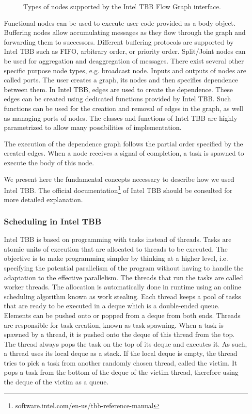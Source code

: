\begin{figure}[phbt]
\centering

\caption{Types of nodes supported by the Intel TBB Flow Graph interface.}
\label{fig:tbbnodes}
\end{figure}

Functional nodes can be used to execute user code provided as a body object. Buffering nodes allow accumulating messages as they flow through the graph and forwarding them to successors. Different buffering protocols are supported by Intel TBB such as FIFO, arbitrary order, or priority order. Split/Joint nodes can be used for aggregation and deaggregation of messages. There exist several other specific purpose node types, e.g. broadcast node. Inputs and outputs of nodes are called ports. %
The user creates a graph, its nodes and then specifies dependence between them. In Intel TBB, edges are used to create the dependence. These edges can be created using dedicated functions provided by Intel TBB. Such functions can be used for the creation and removal of edges in the graph, as well as managing ports of nodes.
The classes and functions of Intel TBB are highly parametrized to allow many possibilities of implementation.

The execution of the dependence graph follows the partial order specified by the created edges. When a node receives a signal of completion, a task is spawned to execute the body of this node. 

We present here the fundamental concepts necessary to describe how we used Intel TBB. The official documentation\footnote{software.intel.com/en-us/tbb-reference-manual} of Intel TBB should be consulted for more detailed explanation. 


\subsubsection{Scheduling in Intel TBB}

Intel TBB is based on programming with tasks instead of threads. Tasks are atomic units of execution that are allocated to threads to be executed. The objective is to make programming simpler by thinking at a higher level, i.e. specifying the potential parallelism of the program without having to handle the adaptation to the effective parallelism. The threads that run the tasks are called worker threads. The allocation is automatically done in runtime using an online scheduling algorithm known as work stealing. Each thread keeps a pool of tasks that are ready to be executed in a deque which is a double-ended queue. Elements can be pushed onto or popped from a deque from both ends. Threads are responsible for task creation, known as task spawning. When a task is spawned by a thread, it is pushed onto the deque of this thread from the top. The thread always pops the task on the top of its deque and executes it. As such, a thread uses its local deque as a stack. If the local deque is empty, the thread tries to pick a task from another randomly chosen thread, called the victim. It pops a task from the bottom of the deque of the victim thread, therefore using the deque of the victim as a queue.

